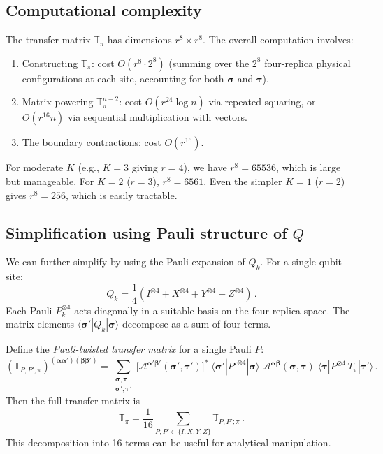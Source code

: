 \documentclass[11pt,a4paper]{article}
\theoremstyle{definition}
\theoremstyle{remark}
\begin{document}
\subsection{Computational complexity}

The transfer matrix $\mathbb{T}_\pi$ has dimensions $r^8 \times r^8$.  The overall computation involves:
\begin{enumerate}[label=(\roman*)]
  \item Constructing $\mathbb{T}_\pi$: cost $O(r^8 \cdot 2^8)$ (summing over the $2^8$ four-replica physical configurations at each site, accounting for both $\boldsymbol{\sigma}$ and $\boldsymbol{\tau}$).
  \item Matrix powering $\mathbb{T}_\pi^{n-2}$: cost $O(r^{24}\log n)$ via repeated squaring, or $O(r^{16} n)$ via sequential multiplication with vectors.
  \item The boundary contractions: cost $O(r^{16})$.
\end{enumerate}
For moderate $K$ (e.g., $K=3$ giving $r=4$), we have $r^8 = 65536$, which is large but manageable.  For $K=2$ ($r=3$), $r^8 = 6561$.  Even the simpler $K=1$ ($r=2$) gives $r^8=256$, which is easily tractable.

\subsection{Simplification using Pauli structure of $Q$}

We can further simplify by using the Pauli expansion of $Q_k$. For a single qubit site:
\begin{equation}
  Q_k = \frac{1}{4}(I^{\otimes 4} + X^{\otimes 4} + Y^{\otimes 4} + Z^{\otimes 4})\,.
\end{equation}
Each Pauli $P_k^{\otimes 4}$ acts diagonally in a suitable basis on the four-replica space. The matrix elements $\langle\boldsymbol{\sigma}'|Q_k|\boldsymbol{\sigma}\rangle$ decompose as a sum of four terms.

Define the \emph{Pauli-twisted transfer matrix} for a single Pauli $P$:
\begin{equation}\label{eq:TP_def}
  (\mathbb{T}_{P,P';\pi})^{(\boldsymbol{\alpha}\boldsymbol{\alpha}')(\boldsymbol{\beta}\boldsymbol{\beta}')}
  = \sum_{\substack{\boldsymbol{\sigma},\boldsymbol{\tau}\\\boldsymbol{\sigma}',\boldsymbol{\tau}'}}
  \bigl[\mathcal{A}^{\boldsymbol{\alpha}'\boldsymbol{\beta}'}(\boldsymbol{\sigma}',\boldsymbol{\tau}')\bigr]^*
  \;\langle\boldsymbol{\sigma}'|P'^{\otimes 4}|\boldsymbol{\sigma}\rangle
  \;\mathcal{A}^{\boldsymbol{\alpha}\boldsymbol{\beta}}(\boldsymbol{\sigma},\boldsymbol{\tau})
  \;\langle\boldsymbol{\tau}|P^{\otimes 4}\,T_\pi|\boldsymbol{\tau}'\rangle\,.
\end{equation}
Then the full transfer matrix is
\begin{equation}
  \mathbb{T}_\pi = \frac{1}{16}\sum_{P,P'\in\{I,X,Y,Z\}} \mathbb{T}_{P,P';\pi}\,.
\end{equation}
This decomposition into 16 terms can be useful for analytical manipulation.
\end{document}

